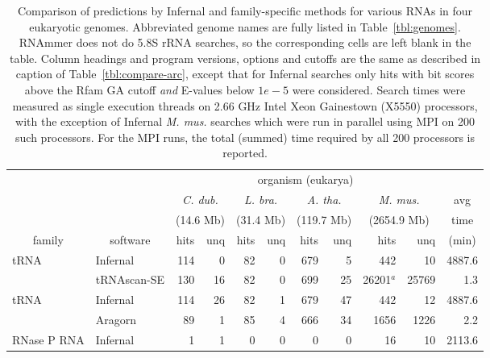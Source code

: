 \begin{table}
\caption{Comparison of predictions by Infernal and family-specific
  methods for various RNAs in four eukaryotic genomes. Abbreviated
  genome names are fully listed in Table~\ref{tbl:genomes}.  RNAmmer
  does not do 5.8S rRNA searches, so the corresponding cells are left
  blank in the table. Column headings and program versions, options
  and cutoffs are the same as described in caption of
  Table~\ref{tbl:compare-arc}, except that for Infernal searches only 
  hits with bit scores above the Rfam GA cutoff \emph{and} E-values
  below $1e-5$ were considered. Search times were measured as single
  execution threads on 2.66 GHz Intel Xeon Gainestown (X5550)
  processors, with the exception of Infernal \emph{M. mus.} searches which were
  run in parallel using MPI on 200 such processors. For the MPI runs,
  the total (summed) time required by all 200 processors is reported.
}
\begin{center}
\begin{tabular}{|l|l|rr|rr|rr|rr|r|}
\multicolumn{1}{c}{} & \multicolumn{1}{c}{} &  \multicolumn{8}{c}{organism (eukarya)}   & \multicolumn{1}{c}{} \\ \cline{3-10}
\multicolumn{1}{c}{}  &  \multicolumn{1}{c|}{}  &  \multicolumn{2}{c|}{\emph{C. dub.}}  &  \multicolumn{2}{c|}{\emph{L. bra.}}  &  \multicolumn{2}{c|}{\emph{A. tha.}}  &  \multicolumn{2}{c|}{\emph{M. mus.}}   & \multicolumn{1}{c}{avg} \\ 
\multicolumn{1}{c}{}  &  \multicolumn{1}{c|}{}  &  \multicolumn{2}{c|}{(14.6 Mb)}  &  \multicolumn{2}{c|}{(31.4 Mb)}  &  \multicolumn{2}{c|}{(119.7 Mb)}  &  \multicolumn{2}{c|}{(2654.9 Mb)}   & \multicolumn{1}{c}{time} \\ 
\multicolumn{1}{c}{family}  &  \multicolumn{1}{c|}{software}  &  hits & unq &  hits & unq &  hits & unq &  hits & unq  & \multicolumn{1}{c}{(min)} \\ \hline 
tRNA             &  Infernal         &  114 &   0 &   82 &   0 &  679 &   5 &  442 &  10 &  4887.6  \\ 
                 &  tRNAscan-SE      &  130 &  16 &   82 &   0 &  699 &  25 &  26201$^a$ & 25769 &     1.3  \\ \hline 
tRNA             &  Infernal         &  114 &  26 &   82 &   1 &  679 &  47 &  442 &  12 &  4887.6  \\ 
                 &  Aragorn          &   89 &   1 &   85 &   4 &  666 &  34 &  1656 & 1226 &     2.2  \\ \hline 
RNase P RNA      &  Infernal         &    1 &   1 &    0 &   0 &    0 &   0 &   16 &  10 &  2113.6  \\ 

\end{tabular}
\end{center}
\end{table}
